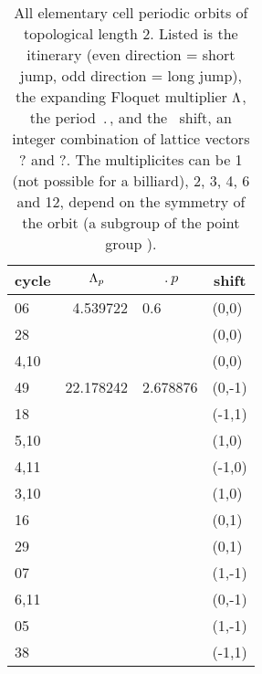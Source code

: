 \begin{table}
\centering
\caption[]{
All elementary cell periodic orbits of topological length 2. Listed is
the itinerary (even direction = short jump, odd direction = long
jump), the expanding Floquet multiplier $\Lambda$, the period $\period{}$, and
the \rpo\ shift, an integer combination of lattice vectors ? and ?. The multiplicites can be 1 (not possible for a billiard),
2, 3, 4, 6 and 12, depend on the symmetry of the orbit (a subgroup of
the point group ). }
    \begin{tabular}{l|r|l|l}
    \multicolumn{1}{c}{cycle} &
    \multicolumn{1}{|c|}{$\Lambda_p$} & \multicolumn{1}{c|}{$\period{p}$}
     & \multicolumn{1}{|c}{shift} \\
    \hline
06  & 4.539722 & 0.6      & (0,0)  \\
28  &          &          & (0,0)  \\
4,10  &        &          & (0,0) \\
    \hline
49   & 22.178242 & 2.678876 & (0,-1) \\
18   &         &          & (-1,1)   \\
5,10 &         &          & (1,0)  \\
4,11 &         &          & (-1,0)  \\
3,10 &         &          & (1,0)  \\
16 &           &          & (0,1) \\
29 &           &          & (0,1) \\
07 &           &          & (1,-1) \\
6,11 &         &          & (0,-1)  \\
05 &           &          & (1,-1) \\
38 &           &          & (-1,1) \\

\end{tabular}
\end{table}
